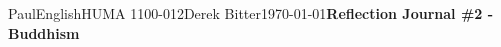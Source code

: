 \documentclass[12pt,letterpaper]{article}
\begin{document}
\begin{mla}{Paul}{English}{HUMA 1100-012}{Derek Bitter}{\today}{\textbf{Reflection Journal \#2 - Buddhism}}




% 
%    
%






\end{mla}
\end{document}
